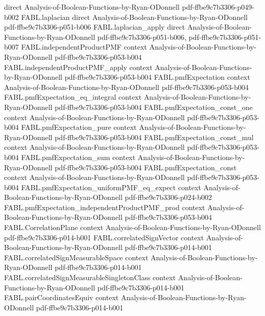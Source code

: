 \begin{theorem}
  {direct}
  {Analysis-of-Boolean-Functions-by-Ryan-ODonnell}
  {pdf-ffbe9c7b3306-p049-b002}
\proofstep
  {FABL.laplacian}
  {direct}
  {Analysis-of-Boolean-Functions-by-Ryan-ODonnell}
  {pdf-ffbe9c7b3306-p051-b006}
\proofstep
  {FABL.laplacian_apply}
  {direct}
  {Analysis-of-Boolean-Functions-by-Ryan-ODonnell}
  {pdf-ffbe9c7b3306-p051-b006,
    pdf-ffbe9c7b3306-p051-b007}
\proofstep
  {FABL.independentProductPMF}
  {context}
  {Analysis-of-Boolean-Functions-by-Ryan-ODonnell}
  {pdf-ffbe9c7b3306-p053-b004}
\proofstep
  {FABL.independentProductPMF_apply}
  {context}
  {Analysis-of-Boolean-Functions-by-Ryan-ODonnell}
  {pdf-ffbe9c7b3306-p053-b004}
\proofstep
  {FABL.pmfExpectation}
  {context}
  {Analysis-of-Boolean-Functions-by-Ryan-ODonnell}
  {pdf-ffbe9c7b3306-p053-b004}
\proofstep
  {FABL.pmfExpectation_eq_integral}
  {context}
  {Analysis-of-Boolean-Functions-by-Ryan-ODonnell}
  {pdf-ffbe9c7b3306-p053-b004}
\proofstep
  {FABL.pmfExpectation_const_one}
  {context}
  {Analysis-of-Boolean-Functions-by-Ryan-ODonnell}
  {pdf-ffbe9c7b3306-p053-b004}
\proofstep
  {FABL.pmfExpectation_pure}
  {context}
  {Analysis-of-Boolean-Functions-by-Ryan-ODonnell}
  {pdf-ffbe9c7b3306-p053-b004}
\proofstep
  {FABL.pmfExpectation_const_mul}
  {context}
  {Analysis-of-Boolean-Functions-by-Ryan-ODonnell}
  {pdf-ffbe9c7b3306-p053-b004}
\proofstep
  {FABL.pmfExpectation_sum}
  {context}
  {Analysis-of-Boolean-Functions-by-Ryan-ODonnell}
  {pdf-ffbe9c7b3306-p053-b004}
\proofstep
  {FABL.pmfExpectation_const}
  {context}
  {Analysis-of-Boolean-Functions-by-Ryan-ODonnell}
  {pdf-ffbe9c7b3306-p053-b004}
\proofstep
  {FABL.pmfExpectation_uniformPMF_eq_expect}
  {context}
  {Analysis-of-Boolean-Functions-by-Ryan-ODonnell}
  {pdf-ffbe9c7b3306-p024-b002}
\proofstep
  {FABL.pmfExpectation_independentProductPMF_prod}
  {context}
  {Analysis-of-Boolean-Functions-by-Ryan-ODonnell}
  {pdf-ffbe9c7b3306-p053-b004}
\proofstep
  {FABL.CorrelationPlane}
  {context}
  {Analysis-of-Boolean-Functions-by-Ryan-ODonnell}
  {pdf-ffbe9c7b3306-p014-b001}
\proofstep
  {FABL.correlatedSignVector}
  {context}
  {Analysis-of-Boolean-Functions-by-Ryan-ODonnell}
  {pdf-ffbe9c7b3306-p014-b001}
\proofstep
  {FABL.correlatedSignMeasurableSpace}
  {context}
  {Analysis-of-Boolean-Functions-by-Ryan-ODonnell}
  {pdf-ffbe9c7b3306-p014-b001}
\proofstep
  {FABL.correlatedSignMeasurableSingletonClass}
  {context}
  {Analysis-of-Boolean-Functions-by-Ryan-ODonnell}
  {pdf-ffbe9c7b3306-p014-b001}
\proofstep
  {FABL.pairCoordinatesEquiv}
  {context}
  {Analysis-of-Boolean-Functions-by-Ryan-ODonnell}
  {pdf-ffbe9c7b3306-p014-b001}

\end{theorem}
